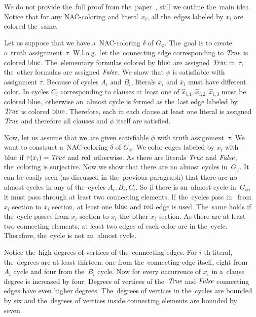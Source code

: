 We do not provide the~full proof from the~paper~\cite{np_complete},
still we outline the~main idea.
Notice that for any NAC-coloring and literal \( x_i \),
all the~edges labeled by \( x_i \) are colored the~same.

Let us suppose that we have a~NAC-coloring \( \delta \) of \( G_\phi \).
The~goal is to create a~truth assignment~\( \tau \).
W.l.o.g.\ let the~connecting edge corresponding to \( \textit{True} \) is colored \( \text{blue} \).
The~elementary formulas colored by \( \text{blue} \) are assigned \( \textit{True} \) in~\( \tau \),
the~other formulas are assigned \( \textit{False} \).
We show that \( \phi \) is satisfiable with assignment \( \tau \).
Because of cycles \( A_i \) and \( B_i \), literals \( x_i \) and \( \bar{x}_i \)
must have different color. In cycles \( C_i \) corresponding to clauses
at least one of \( \hat{x}_{i,1}, \hat{x}_{i,2}, \hat{x}_{i,3} \) must be colored \( \text{blue} \),
otherwise an~almost cycle is formed as the~last edge labeled by \( \textit{True} \) is colored \( \text{blue} \).
Therefore, each in each clause at least one literal is assigned \( \textit{True} \)
and therefore all clauses and \( \phi \) itself are satisfied.

Now, let us assume that we are given satisfiable \( \phi \)
with truth assignment~\( \tau \).
We want to construct a~NAC-coloring \( \delta \) of \( G_\phi \).
We color edges labeled by \( x_i \) with \( \text{blue} \) if \( \tau(x_i) = \textit{True} \)
and \( \text{red} \) otherwise.
As there are literals \( \textit{True} \) and \( \textit{False} \), the~coloring is surjective.
Now we show that there are no almost cycles in~\( G_\phi \).
It can be easily seen (as discussed in the~previous paragraph)
that there are no almost cycles in any of the~cycles \( A_i, B_i, C_i \).
So if there is an~almost cycle in~\( G_\phi \), it must pass through
at least two connecting elements.
If the~cycles pass in~
from \( x_i \) section to \( \bar{x}_i \) section, at least one \( \text{blue} \)
and \( \text{red} \) edge is used. The~same holds if the~cycle passes
from \( x_i \) section to \( x_i \) the~other \( x_i \) section.
As there are at least two connecting elements, at least two edges of each color are in the~cycle.
Therefore, the~cycle is not an~almost cycle.

Notice the~high degrees of vertices of the~connecting edges.
For \( i \)-th literal, the~degrees are at least thirteen:
one from the~connecting edge itself,
eight from \( A_i \) cycle and four from the~\( B_i \) cycle.
Now for every occurrence of \( x_i \) in a~clause degree is increased by four.
%
Degrees of vertices of the~\( \textit{True} \) and \( \textit{False} \) connecting edges
have even higher degrees.
%
The~degrees of vertices in the~cycles are bounded by six
and the~degrees of vertices inside connecting elements are bounded by seven.


